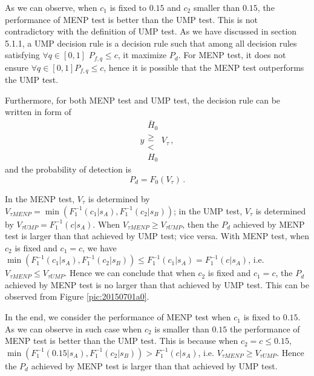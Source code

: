 As we can observe, when $c_1$ is fixed to $0.15$ and $c_2$ smaller than $0.15$, the performance of MENP test is better than the UMP test. This is not contradictory with the definition of UMP test. As we have discussed in section 5.1.1, a UMP decision rule is a decision rule such that among all decision rules satisfying $\forall q \in [0, 1]$ $P_{f,q} \leq c$, it maximize $P_d$. For MENP test, it does not ensure $\forall q \in [0, 1]$$P_{f,q} \leq c$, hence it is possible that the MENP test outperforms the UMP test.   

Furthermore, for both MENP test and UMP test, the decision rule can be written in form of
\begin{equation}
  y \substack{\bar{H}_0\\ \geq\\ < \\ H_0 } V_\tau\,,
  \label{20150701a4}
\end{equation}
and the probability of detection is 
\begin{equation}
  P_d = F_0(V_\tau)\,.
  \label{20150701a5}
\end{equation}

In the MENP test, $V_\tau$ is determined by $V_{\tau MENP}= \min (F_1^{-1}(c_1|s_A), F_1^{-1}(c_2|s_B))$; in the UMP test, $V_\tau$ is determined by $V_{\tau UMP} = F_1^{-1}(c|s_A)$. When $V_{\tau MENP}  \geq V_{\tau UMP}$, then the $P_d$ achieved by MENP test is larger than that achieved by UMP test; vice versa. 
With MENP test, when $c_2$ is fixed and $c_1 = c$, we have $\min (F_1^{-1}(c_1|s_A), F_1^{-1}(c_2|s_B)) \leq F_1^{-1}(c_1|s_A) = F_1^{-1}(c|s_A) $, i.e. 
$V_{\tau MENP} \leq V_{\tau UMP}$.
Hence we can conclude that when $c_2$ is fixed and $c_1 = c$, the $P_d$ achieved by MENP test is no larger than that achieved by UMP test. This can be observed from Figure \ref{pic:20150701a0}. 

In the end, we consider the performance of MENP test when $c_1$ is fixed to $0.15$. As we can observe in such case  when $c_2$ is smaller than $0.15$ the performance of MENP test is better than the UMP test. This is because when $c_2 = c  \leq 0.15$, $\min (F_1^{-1}(0.15|s_A), F_1^{-1}(c_2|s_B)) > F_1^{-1}(c|s_A)$, i.e. $V_{\tau MENP} \geq V_{\tau UMP }$.   Hence the $P_d$ achieved by MENP test is larger than that achieved by UMP test. 

\typeout{}

